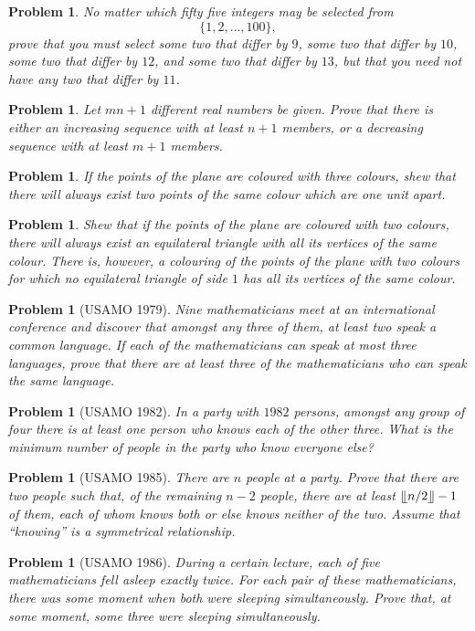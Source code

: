 \documentclass[11pt, openany]{book}
\theoremstyle{change} \theoremheaderfont{\blue\sffamily\bfseries}
\newtheorem{pro}[thm]{Problem}
\theoremstyle{nonumberplain} \theoremheaderfont{\sffamily\bfseries}
\newcommand{\dis}{\displaystyle}
\newcommand{\í}{\'{\i}}
\begin{document}
\begin{multicols}{2}
\begin{pro} No matter which fifty five integers may be selected from $$\{ 1, 2, \ldots , 100\} , $$
prove that you must select some two that differ by $9$, some two
that differ by $10$, some two that differ by $12$, and some two
that differ by $13$, but that you need not have any two that
differ by $11$. \end{pro}
\begin{pro} Let $mn + 1$ different real numbers be given. Prove that
there is either an increasing sequence with at least $n + 1$
members, or a decreasing sequence with at least $m + 1$
members.\end{pro}
\begin{pro} If the points of the plane are coloured with three colours,
shew that there will always exist two points of the same colour
which are one unit apart.
\end{pro}
\begin{pro} Shew that if the points of the plane are coloured with two
colours, there will always exist an equilateral triangle with all
its vertices of the same colour. There is, however, a colouring of
the points of the plane with two colours for which no equilateral
triangle of side $1$ has all its vertices of the same colour.
\end{pro}
\begin{pro}[USAMO 1979] Nine mathematicians meet at an international conference
and discover that amongst any three of them, at least two speak a
common language. If each of the mathematicians can speak at most
three languages, prove that there are at least three of the
mathematicians who can speak the same language.\end{pro}
\begin{pro}[USAMO 1982] In a party with $1982$ persons, amongst any group
of four there is at least one person who knows each of the other
three. What is the minimum number of people in the party who know
everyone else?\end{pro}
\begin{pro}[USAMO 1985] There are $n$ people at a party. Prove that there are two people such that,
of the remaining $n - 2$ people, there are at least $\dis{\llfloor
n/2\rrfloor - 1}$ of them, each of whom knows both or else knows
neither of the two. Assume that ``knowing'' is a symmetrical
relationship.\end{pro}
\begin{pro}[USAMO 1986] During a certain lecture, each of five mathematicians fell
asleep exactly twice. For each pair of these mathematicians, there
was some moment when both were sleeping simultaneously. Prove
that, at some moment, some three were sleeping simultaneously.
\end{pro}
\end{multicols}
\end{document}
